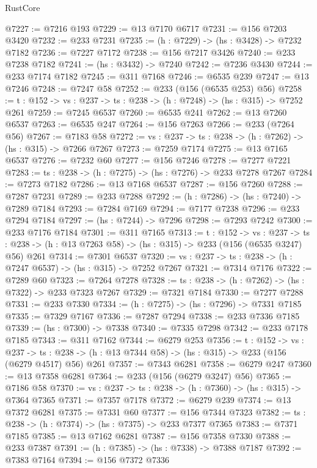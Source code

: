\begin{lexlean}{RustCore}
\begin{coremodule}
@7227 := @7216 @193
@7229 := @13 @7170 @6717
@7231 := @156 @7203 @3420
@7232 := @233 @7231
@7235 := (h : @7229) -> (hs : @3428) -> @7232 @7182
@7236 := @7227 @7172
@7238 := @156 @7217 @3426
@7240 := @233 @7238 @7182
@7241 := (hs : @3432) -> @7240
@7242 := @7236 @3430
@7244 := @233 @7174 @7182
@7245 := @311 @7168
@7246 := @6535 @239
@7247 := @13 @7246
@7248 := @7247 @58
@7252 := @233 (@156 (@6535 @253) @56)
@7258 := {t : @152} -> {vs : @237} -> {ts : @238} -> (h : @7248) -> (hs : @315) -> @7252 @261
@7259 := @7245 @6537
@7260 := @6535 @241
@7262 := @13 @7260 @6537
@7263 := @6535 @247
@7264 := @156 @7263
@7266 := @233 (@7264 @56)
@7267 := @7183 @58
@7272 := {vs : @237} -> {ts : @238} -> (h : @7262) -> (hs : @315) -> @7266 @7267
@7273 := @7259 @7174
@7275 := @13 @7165 @6537
@7276 := @7232 @60
@7277 := @156 @7246
@7278 := @7277 @7221
@7283 := {ts : @238} -> (h : @7275) -> (hs : @7276) -> @233 @7278 @7267
@7284 := @7273 @7182
@7286 := @13 @7168 @6537
@7287 := @156 @7260
@7288 := @7287 @7231
@7289 := @233 @7288
@7292 := (h : @7286) -> (hs : @7240) -> @7289 @7184
@7293 := @7284 @7169
@7294 := @7177 @7238
@7296 := @233 @7294 @7184
@7297 := (hs : @7244) -> @7296
@7298 := @7293 @7242
@7300 := @233 @7176 @7184
@7301 := @311 @7165
@7313 := {t : @152} ->
  {vs : @237} ->
  {ts : @238} -> (h : @13 @7263 @58) -> (hs : @315) -> @233 (@156 (@6535 @3247) @56) @261
@7314 := @7301 @6537
@7320 := {vs : @237} -> {ts : @238} -> (h : @7247 @6537) -> (hs : @315) -> @7252 @7267
@7321 := @7314 @7176
@7322 := @7289 @60
@7323 := @7264 @7278
@7328 := {ts : @238} -> (h : @7262) -> (hs : @7322) -> @233 @7323 @7267
@7329 := @7321 @7184
@7330 := @7277 @7288
@7331 := @233 @7330
@7334 := (h : @7275) -> (hs : @7296) -> @7331 @7185
@7335 := @7329 @7167
@7336 := @7287 @7294
@7338 := @233 @7336 @7185
@7339 := (hs : @7300) -> @7338
@7340 := @7335 @7298
@7342 := @233 @7178 @7185
@7343 := @311 @7162
@7344 := @6279 @253
@7356 := {t : @152} ->
  {vs : @237} ->
  {ts : @238} -> (h : @13 @7344 @58) -> (hs : @315) -> @233 (@156 (@6279 @4517) @56) @261
@7357 := @7343 @6281
@7358 := @6279 @247
@7360 := @13 @7358 @6281
@7364 := @233 (@156 (@6279 @3247) @56)
@7365 := @7186 @58
@7370 := {vs : @237} -> {ts : @238} -> (h : @7360) -> (hs : @315) -> @7364 @7365
@7371 := @7357 @7178
@7372 := @6279 @239
@7374 := @13 @7372 @6281
@7375 := @7331 @60
@7377 := @156 @7344 @7323
@7382 := {ts : @238} -> (h : @7374) -> (hs : @7375) -> @233 @7377 @7365
@7383 := @7371 @7185
@7385 := @13 @7162 @6281
@7387 := @156 @7358 @7330
@7388 := @233 @7387
@7391 := (h : @7385) -> (hs : @7338) -> @7388 @7187
@7392 := @7383 @7164
@7394 := @156 @7372 @7336

\end{coremodule}
\end{lexlean}
